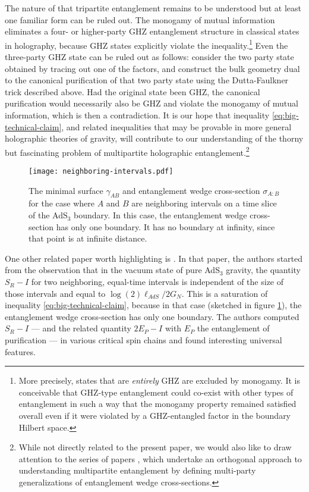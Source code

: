 \documentclass[a4paper,11pt]{article}
\begin{document}
The nature of that tripartite entanglement remains to be understood but at least one familiar form can be ruled out. The monogamy of mutual information~\cite{hayden2013holographic, maximin} eliminates a four- or higher-party GHZ entanglement structure in classical states in holography, because GHZ states explicitly violate the inequality.\footnote{More precisely, states that are \textit{entirely} GHZ are excluded by monogamy. It is conceivable that GHZ-type entanglement could co-exist with other types of entanglement in such a way that the monogamy property remained satisfied overall even if it were violated by a GHZ-entangled factor in the boundary Hilbert space.} Even the three-party GHZ state can be ruled out as follows: consider the two party state obtained by tracing out one of the factors, and construct the bulk geometry dual to the canonical purification of that two party state using the Dutta-Faulkner trick described above. Had the original state been GHZ, the canonical purification would necessarily also be GHZ and violate the monogamy of mutual information, which is then a contradiction.
It is our hope that inequality \eqref{eq:big-technical-claim}, and related inequalities that may be provable in more general holographic theories of gravity, will contribute to our understanding of the thorny but fascinating problem of multipartite holographic entanglement.\footnote{While not directly related to the present paper, we would also like to draw attention to the series of papers \cite{ning1,ning2,ning3,ning4}, which undertake an orthogonal approach to understanding multipartite entanglement by defining multi-party generalizations of entanglement wedge cross-sections.}

\begin{figure}
    \centering
    \texttt{[image: neighboring-intervals.pdf]}
    \caption{The minimal surface $\gamma_{AB}$ and entanglement wedge cross-section $\sigma_{A:B}$ for the case where $A$ and $B$ are neighboring intervals on a time slice of the AdS$_3$ boundary. In this case, the entanglement wedge cross-section has only one boundary. It has no boundary at infinity, since that point is at infinite distance.}
    \label{fig:neighboring-intervals}
\end{figure}

One other related paper worth highlighting is \cite{zou2021universal}. In that paper, the authors started from the observation that in the vacuum state of pure AdS$_3$ gravity, the quantity $S_R - I$ for two neighboring, equal-time intervals is independent of the size of those intervals and equal to $\log(2) \ell_{AdS} / 2 G_N$. This is a saturation of inequality \eqref{eq:big-technical-claim}, because in that case (sketched in figure \ref{fig:neighboring-intervals}), the entanglement wedge cross-section has only one boundary. The authors computed $S_R - I$ --- and the related quantity $2 E_P - I$ with $E_P$ the entanglement of purification --- in various critical spin chains and found interesting universal features.
\end{document}
